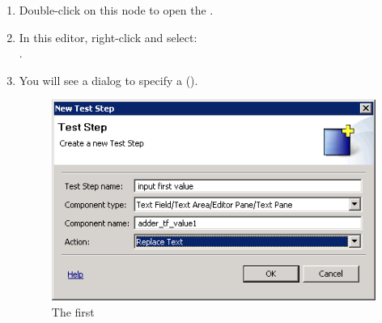 \begin{enumerate}
 \item Double-click on this node to open the \gdtestcaseeditor{}. 
 \item In this editor, right-click and select:\\ .
 \item You will see a dialog to specify a \gdstep{} (). 

\begin{figure}[h]
\begin{center}
\includegraphics{Tutorials/PS/TutFirstTestStep}
\caption{The first \gdstep{}}
\label{TutFirstTestStep}
\end{center}
\end{figure}



\end{enumerate}
